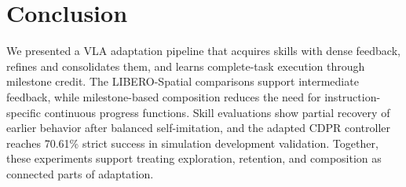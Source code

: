 \section{Conclusion}\label{sec:conclusion}
We presented a VLA adaptation pipeline that acquires skills with dense feedback, refines and consolidates them, and learns complete-task execution through milestone credit. The LIBERO-Spatial comparisons support intermediate feedback, while milestone-based composition reduces the need for instruction-specific continuous progress functions. Skill evaluations show partial recovery of earlier behavior after balanced self-imitation, and the adapted CDPR controller reaches 70.61\% strict success in simulation development validation. Together, these experiments support treating exploration, retention, and composition as connected parts of adaptation.

